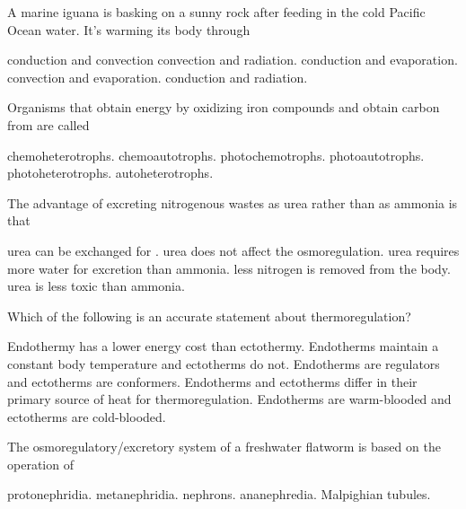 \newpage

\question
A marine iguana is basking on a sunny rock after feeding in the cold Pacific Ocean water. It's warming its body through 

\begin{choices}
\choice conduction and convection 
\choice convection and radiation.  
\choice conduction and evaporation. 
\choice convection and evaporation. 
\correctchoice conduction and radiation. 
\end{choices}

\question
Organisms that obtain energy by oxidizing iron compounds and obtain carbon from  are called

\begin{choices}
\choice chemoheterotrophs. 
\correctchoice chemoautotrophs. 
\choice photochemotrophs. 
\choice photoautotrophs. 
\choice photoheterotrophs. 
\choice autoheterotrophs. 
\end{choices}

\question
The advantage of excreting nitrogenous wastes as urea rather than as ammonia is that

\begin{choices}
\choice urea can be exchanged for . 
\choice urea does not affect the osmoregulation. 
\choice urea requires more water for excretion than ammonia. 
\choice less nitrogen is removed from the body. 
\correctchoice urea is less toxic than ammonia. 
\end{choices}

\question
Which of the following is an accurate statement about thermoregulation?

\begin{choices}
\choice Endothermy has a lower energy cost than ectothermy. 
\choice Endotherms maintain a constant body temperature and ectotherms do not. 
\choice Endotherms are regulators and ectotherms are conformers. 
\correctchoice Endotherms and ectotherms differ in their primary source of heat for thermoregulation. 
\choice Endotherms are warm-blooded and ectotherms are cold-blooded.  
\end{choices}

\question
The osmoregulatory/excretory system of a freshwater flatworm is based on the operation of

\begin{choices}
\correctchoice protonephridia. 
\choice metanephridia. 
\choice nephrons. 
\choice ananephredia. 
\choice Malpighian tubules. 
\end{choices}


